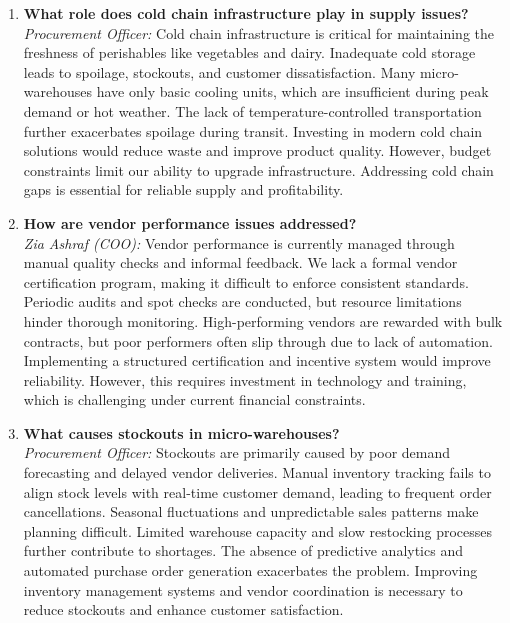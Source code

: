 \documentclass[12pt,a4paper]{article}
\begin{document}
\begin{enumerate}
        \item \textbf{What role does cold chain infrastructure play in supply issues?} \\
        \textit{Procurement Officer:} Cold chain infrastructure is critical for maintaining the freshness of perishables like vegetables and dairy. Inadequate cold storage leads to spoilage, stockouts, and customer dissatisfaction. Many micro-warehouses have only basic cooling units, which are insufficient during peak demand or hot weather. The lack of temperature-controlled transportation further exacerbates spoilage during transit. Investing in modern cold chain solutions would reduce waste and improve product quality. However, budget constraints limit our ability to upgrade infrastructure. Addressing cold chain gaps is essential for reliable supply and profitability.

        \item \textbf{How are vendor performance issues addressed?} \\
        \textit{Zia Ashraf (COO):} Vendor performance is currently managed through manual quality checks and informal feedback. We lack a formal vendor certification program, making it difficult to enforce consistent standards. Periodic audits and spot checks are conducted, but resource limitations hinder thorough monitoring. High-performing vendors are rewarded with bulk contracts, but poor performers often slip through due to lack of automation. Implementing a structured certification and incentive system would improve reliability. However, this requires investment in technology and training, which is challenging under current financial constraints.

        \item \textbf{What causes stockouts in micro-warehouses?} \\
        \textit{Procurement Officer:} Stockouts are primarily caused by poor demand forecasting and delayed vendor deliveries. Manual inventory tracking fails to align stock levels with real-time customer demand, leading to frequent order cancellations. Seasonal fluctuations and unpredictable sales patterns make planning difficult. Limited warehouse capacity and slow restocking processes further contribute to shortages. The absence of predictive analytics and automated purchase order generation exacerbates the problem. Improving inventory management systems and vendor coordination is necessary to reduce stockouts and enhance customer satisfaction.


\end{enumerate}
\end{document}
